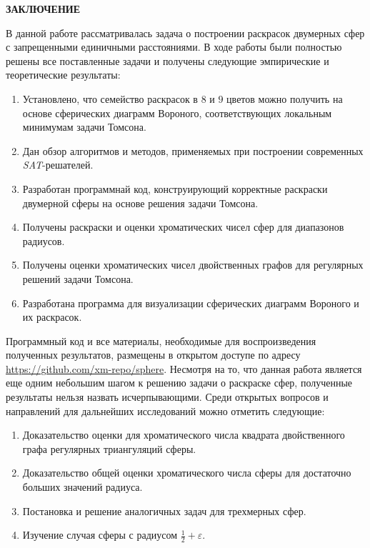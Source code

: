 \newpage
\begin{center}
\noindent\textbf{ЗАКЛЮЧЕНИЕ}\label{chapters:conclusions}
\vspace{1.5mm}
\end{center}

В данной работе рассматривалась задача о построении раскрасок двумерных сфер с запрещенными единичными расстояниями. 
В ходе работы были полностью решены все поставленные задачи и получены следующие эмпирические и теоретические результаты:

\begin{enumerate}

\item Установлено, что семейство раскрасок в $8$ и $9$ цветов можно получить на основе сферических диаграмм Вороного, соответствующих локальным минимумам задачи Томсона.  

\item Дан обзор алгоритмов и методов, применяемых при построении современных \textit{SAT}-решателей.

\item Разработан программнай код, конструирующий корректные раскраски двумерной сферы на основе решения задачи Томсона.

\item Получены раскраски и оценки хроматических чисел сфер для диапазонов радиусов.

\item Получены оценки хроматических чисел двойственных графов для регулярных решений задачи Томсона.

\item Разработана программа для визуализации сферических диаграмм Вороного и их раскрасок.

\end{enumerate}

Программный код и все материалы, необходимые для воспроизведения полученных результатов, размещены в открытом доступе по адресу
\url{https://github.com/xm-repo/sphere}.
Несмотря на то, что данная работа является еще одним небольшим шагом к решению задачи о раскраске сфер, полученные результаты нельзя назвать исчерпывающими. Среди открытых вопросов и направлений для дальнейших исследований можно отметить следующие:

\begin{enumerate}

\item Доказательство оценки для хроматического числа квадрата двойственного графа регулярных триангуляций сферы.
\item Доказательство общей оценки хроматического числа сферы для достаточно больших значений радиуса.
\item Постановка и решение аналогичных задач для трехмерных сфер.
\item Изучение случая сферы с радиусом $\frac{1}{2}+\varepsilon$.

\end{enumerate}
